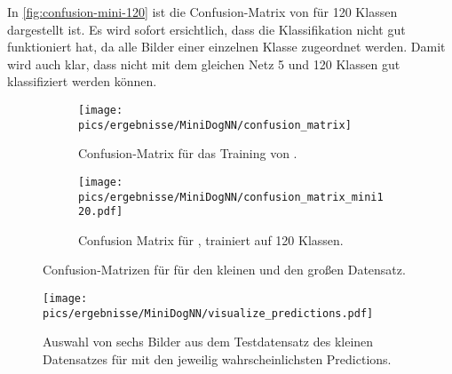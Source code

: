 In \autoref{fig:confusion-mini-120} ist die Confusion-Matrix von \MiniDog{} für
120 Klassen dargestellt ist. Es wird sofort ersichtlich, dass die Klassifikation
nicht gut funktioniert hat, da alle Bilder einer einzelnen Klasse zugeordnet
werden. Damit wird auch klar, dass nicht mit dem gleichen Netz 5 und 120 Klassen
gut klassifiziert werden können.

\begin{figure}
  \begin{subfigure}{0.49\textwidth}
    \centering
    \texttt{[image: pics/ergebnisse/MiniDogNN/confusion\_matrix]}
    \caption{Confusion-Matrix für das Training von \MiniDog{}.}
    \label{fig:confusion-mini}
  \end{subfigure}
  \begin{subfigure}{0.49\textwidth}
    \centering
    \texttt{[image: pics/ergebnisse/MiniDogNN/confusion\_matrix\_mini120.pdf]}
    \caption{Confusion Matrix für \MiniDog{}, trainiert auf 120 Klassen.}
    \label{fig:confusion-mini-120}
  \end{subfigure}
  \caption{Confusion-Matrizen für \MiniDog{} für den kleinen und den großen Datensatz.}
  \label{fig:confusion-mini-gesamt}
\end{figure}


\begin{figure}
  \centering
  \texttt{[image: pics/ergebnisse/MiniDogNN/visualize\_predictions.pdf]}
  \caption{Auswahl von sechs Bilder aus dem Testdatensatz des kleinen
  Datensatzes für \MiniDog{} mit den jeweilig wahrscheinlichsten Predictions.}
  \label{fig:visualize-pred}
\end{figure}


\subsection{\PreDog}

